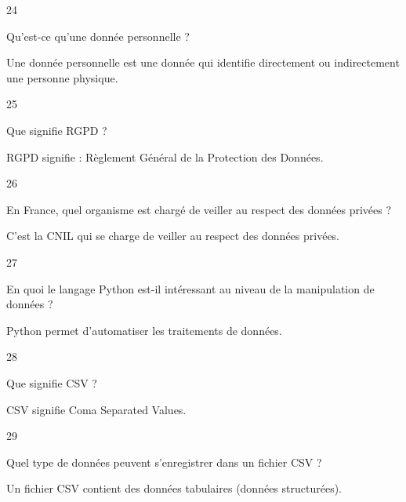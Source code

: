 \begin{taggedblock}{24}
\begin{exoq}
Qu'est-ce qu'une donnée personnelle ?
\end{exoq} 
\begin{exor}
Une donnée personnelle est une donnée qui identifie directement ou indirectement une personne physique. \bqr
\end{exor} 
\end{taggedblock}

\begin{taggedblock}{25}
\begin{exoq}
Que signifie RGPD ?
\end{exoq} 
\begin{exor}
RGPD signifie : Règlement Général de la Protection des Données. \bqr
\end{exor} 
\end{taggedblock}

\begin{taggedblock}{26}
\begin{exoq}
En France, quel organisme est chargé de veiller au respect des données privées ?
\end{exoq} 
\begin{exor}
C'est la CNIL qui se charge de veiller au respect des données privées. \bqr
\end{exor} 
\end{taggedblock}

\begin{taggedblock}{27}
\begin{exoq}
En quoi le langage Python est-il intéressant au niveau de la manipulation de données ?
\end{exoq} 
\begin{exor}
Python permet d'automatiser les traitements de données. \bqr
\end{exor} 
\end{taggedblock}

\begin{taggedblock}{28}
\begin{exoq}
Que signifie CSV ?
\end{exoq} 
\begin{exor}
CSV signifie Coma Separated Values. \bqr
\end{exor} 
\end{taggedblock}

\begin{taggedblock}{29}
\begin{exoq}
Quel type de données peuvent s'enregistrer dans un fichier CSV ?
\end{exoq} 
\begin{exor}
Un fichier CSV contient des données tabulaires (données structurées). \bqr
\end{exor} 
\end{taggedblock}


